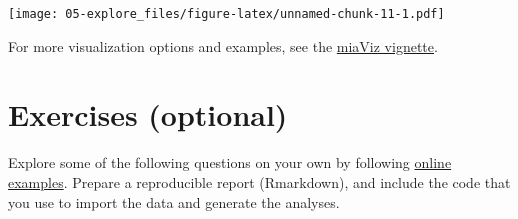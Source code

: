 \documentclass[
  oneside]{book}
\begin{document}
\texttt{[image: 05-explore\_files/figure-latex/unnamed-chunk-11-1.pdf]}

For more visualization options and examples, see the \href{https://microbiome.github.io/miaViz/articles/miaViz.html}{miaViz vignette}.

\hypertarget{exercises-optional}{%
\section{Exercises (optional)}\label{exercises-optional}}

Explore some of the following questions on your own by following
\href{https://microbiome.github.io/OMA/}{online examples}. Prepare a
reproducible report (Rmarkdown), and include the code that you use to
import the data and generate the analyses.
\end{document}

